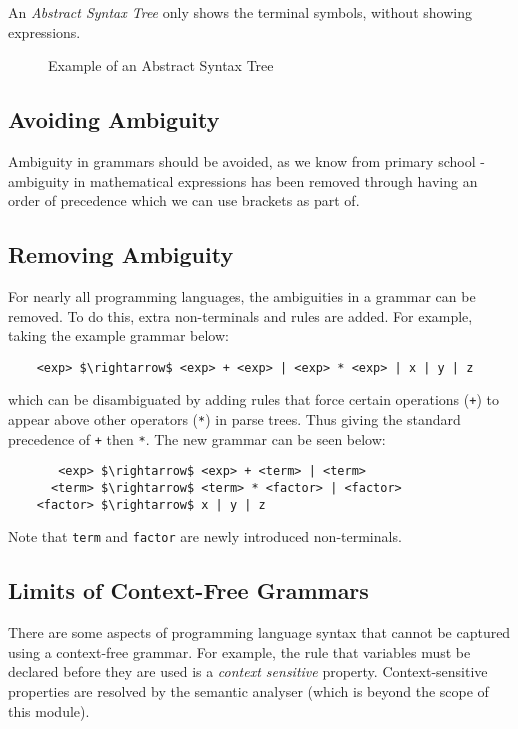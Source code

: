 An \textit{Abstract Syntax Tree} only shows the terminal symbols, without showing expressions. 

\begin{figure}[H]
\centering
{}
\caption{Example of an Abstract Syntax Tree}
\end{figure}
    

\subsection{Avoiding Ambiguity}
Ambiguity in grammars should be avoided, as we know from primary school - ambiguity in mathematical expressions has been removed through having an order of precedence which we can use brackets as part of.

\subsection{Removing Ambiguity}
For nearly all programming languages, the ambiguities in a grammar can be removed. To do this, extra non-terminals and rules are added. For example, taking the example grammar below:
\begin{lstlisting}
    <exp> $\rightarrow$ <exp> + <exp> | <exp> * <exp> | x | y | z
\end{lstlisting}
which can be disambiguated by adding rules that force certain operations (\verb|+|) to appear above other operators (\verb|*|) in parse trees. Thus giving the standard precedence of \verb|+| then \verb|*|. The new grammar can be seen below:
\begin{lstlisting}
       <exp> $\rightarrow$ <exp> + <term> | <term>
      <term> $\rightarrow$ <term> * <factor> | <factor>
    <factor> $\rightarrow$ x | y | z
\end{lstlisting}
Note that \verb|term| and \verb|factor| are newly introduced non-terminals.

\subsection{Limits of Context-Free Grammars}
There are some aspects of programming language syntax that cannot be captured using a context-free grammar. For example, the rule that variables must be declared before they are used is a \textit{context sensitive} property. Context-sensitive properties are resolved by the semantic analyser (which is beyond the scope of this module). 

